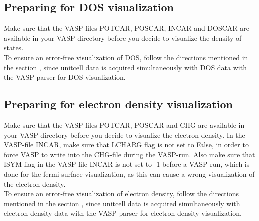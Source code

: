 \subsection{Preparing for DOS visualization}

Make sure that the VASP-files POTCAR, POSCAR, INCAR and DOSCAR are available in your VASP-directory before you decide to visualize the density of states. \\

To ensure an error-free visualization of DOS, follow the directions mentioned in the section \emph{}, since unitcell data is acquired simultaneously with DOS data with the VASP parser for DOS visualization.

\subsection{Preparing for electron density visualization}

Make sure that the VASP-files POTCAR, POSCAR and CHG are available in your VASP-directory before you decide to visualize the electron density. In the VASP-file INCAR, make sure that LCHARG flag is not set to False, in order to force VASP to write into the CHG-file during the VASP-run. Also make sure that ISYM flag in the VASP-file INCAR is not set to -1 before a VASP-run, which is done for the fermi-surface visualization, as this can cause a wrong visualization of the electron density.\\

To ensure an error-free visualization of electron density, follow the directions mentioned in the section \emph{}, since unitcell data is acquired simultaneously with electron density data with the VASP parser for electron density visualization.

